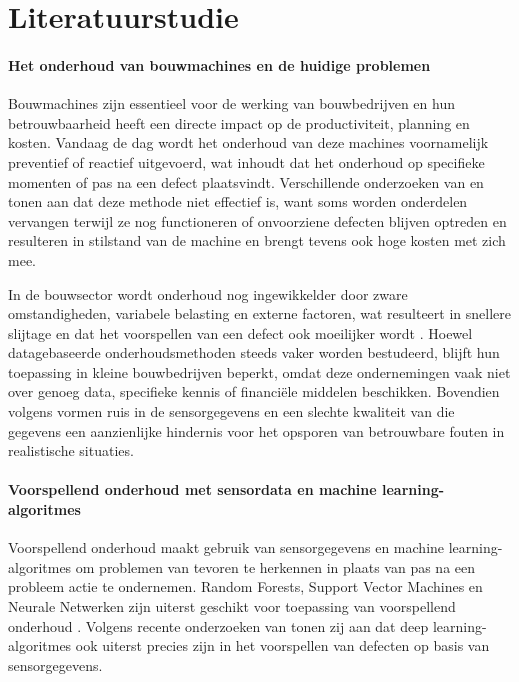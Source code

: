 
\section{Literatuurstudie}%
\label{sec:literatuurstudie}

\paragraph{Het onderhoud van bouwmachines en de huidige problemen}

Bouwmachines zijn essentieel voor de werking van bouwbedrijven en hun betrouwbaarheid heeft een directe impact op de productiviteit, planning en kosten\autocite{Mikulic2024}. Vandaag de dag wordt het onderhoud van deze machines voornamelijk preventief of reactief uitgevoerd, wat inhoudt dat het onderhoud op specifieke momenten of pas na een defect plaatsvindt\autocite{Mikulic2024, Morganti2024}. Verschillende onderzoeken van \textcite{ErRatby2025} en \textcite{Deepak2025} tonen aan dat deze methode niet effectief is, want soms worden onderdelen vervangen terwijl ze nog functioneren of onvoorziene defecten blijven optreden en resulteren in stilstand van de machine en brengt tevens ook hoge kosten met zich mee.

In de bouwsector wordt onderhoud nog ingewikkelder door zware omstandigheden, variabele belasting en externe factoren, wat resulteert in snellere slijtage en dat het voorspellen van een defect ook moeilijker wordt \autocite{Mikulic2024}. Hoewel datagebaseerde onderhoudsmethoden steeds vaker worden bestudeerd, blijft hun toepassing in kleine bouwbedrijven beperkt, omdat deze ondernemingen vaak niet over genoeg data, specifieke kennis of financiële middelen beschikken\autocite{Elahi2023}. Bovendien volgens \textcite{Wang2025} vormen ruis in de sensorgegevens en een slechte kwaliteit van die gegevens een aanzienlijke hindernis voor het opsporen van betrouwbare fouten in realistische situaties.

\paragraph{Voorspellend onderhoud met sensordata en machine learning-algoritmes}

Voorspellend onderhoud maakt gebruik van sensorgegevens en machine learning-algoritmes om problemen van tevoren te herkennen in plaats van pas na een probleem actie te ondernemen. Random Forests, Support Vector Machines en Neurale Netwerken zijn uiterst geschikt voor toepassing van voorspellend onderhoud \autocite{Carvalho2019}. Volgens recente onderzoeken van \textcite{Li2025} tonen zij aan dat deep learning-algoritmes ook uiterst precies zijn in het voorspellen van defecten op basis van sensorgegevens.

